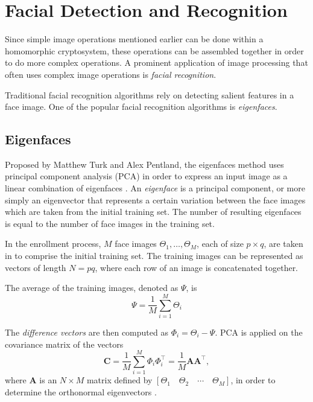\section{Facial Detection and Recognition}

Since simple image operations mentioned earlier can be done within a homomorphic cryptosystem, these operations can be assembled together in order to do more complex operations. A prominent application of image processing that often uses complex image operations is \textit{facial recognition}.

Traditional facial recognition algorithms rely on detecting salient features in a face image. One of the popular facial recognition algorithms is \textit{eigenfaces}.

\subsection{Eigenfaces}

Proposed by Matthew Turk and Alex Pentland, the eigenfaces method uses principal component analysis (PCA) in order to express an input image as a linear combination of eigenfaces \cite{turk_eigenfaces_1991}. An \textit{eigenface} is a principal component, or more simply an eigenvector that represents a certain variation between the face images which are taken from the initial training set. The number of resulting eigenfaces is equal to the number of face images in the training set.

In the enrollment process, $M$ face images $\Theta_1, \ldots, \Theta_M$, each of size $p \times q$, are taken in to comprise the initial training set. The training images can be represented as vectors of length $N = pq$, where each row of an image is concatenated together.

The average of the training images, denoted as $\Psi$, is 
\[ \Psi = \frac{1}{M} \sum_{i=1}^{M} \Theta_i \]

The \textit{difference vectors} are then computed as $\Phi_i = \Theta_i - \Psi$. PCA is applied on the covariance matrix of the vectors
\[ \mathbf{C} = \frac{1}{M} \sum_{i=1}^M \Phi_i \Phi_i^\top = \frac{1}{M} \mathbf{A}\mathbf{A}^\top,\]
where $\mathbf{A}$ is an $N \times M$ matrix defined by $\left[\Theta_1 \quad \Theta_2 \quad \cdots \quad \Theta_M\right]$, in order to determine the orthonormal eigenvectors \cite{hutchison_privacy-preserving_2009}.

